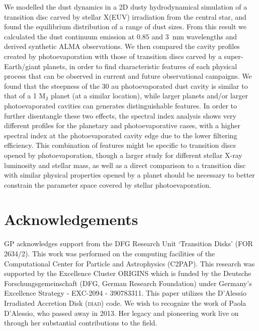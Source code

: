 \documentclass[fleqn,usenatbib]{mnras}
\begin{document}
We modelled the dust dynamics in a 2D dusty hydrodynamical simulation of a transition disc carved by stellar X(EUV) irradiation from the central star, and found the equilibrium distribution of a range of dust sizes.
From this result we calculated the dust continuum emission at $0.85$ and \SI{3}{mm} wavelengths and derived synthetic ALMA observations. We then compared the cavity profiles created by photoevaporation with those of transition discs carved by a super-Earth/giant planets, in order to find characteristic features of each physical process that can be observed in current and future observational campaigns.
We found that the steepness of the 30 au photoevaporated dust cavity is similar to that of a 1 M$_\mathrm{J}$ planet (at a similar location), while larger planets and/or larger photoevaporated cavities can generates distinguishable features.
In order to further disentangle these two effects, the spectral index analysis shows very different profiles for the planetary and photoevaporative cases, with a higher spectral index at the photoevaporated cavity edge due to the lower filtering efficiency.
This combination of features might be specific to transition discs opened by photoevaporation, though a larger study for different stellar X-ray luminosity and stellar mass, as well as a direct comparison to a transition disc with similar physical properties opened by a planet should be necessary to better constrain the parameter space covered by stellar photoevaporation.

\section*{Acknowledgements}
GP acknowledges support from the DFG Research Unit ‘Transition Disks’ (FOR 2634/2).
This work was performed on the computing facilities of the Computational Center for Particle and Astrophysics (C2PAP).
This research was supported by the Excellence Cluster ORIGINS which is funded by the Deutsche Forschungsgemeinschaft (DFG, German Research Foundation) under Germany's Excellence Strategy - EXC-2094 - 390783311.
This paper utilizes the D’Alessio Irradiated Accretion Disk (\textsc{diad}) code. We wish to recognize the work of Paola D’Alessio, who passed away in 2013. Her legacy and pioneering work live on through her substantial contributions to the field.
\end{document}
